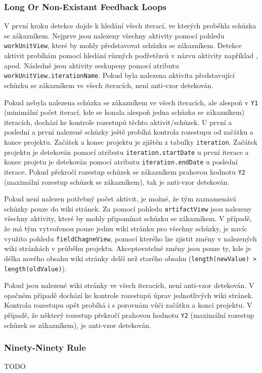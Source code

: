 \documentclass[czech,DP]{thesiskiv}
\begin{document}
\subsubsection{Long Or Non-Existant Feedback Loops}
V první kroku detekce dojde k hledání všech iterací, ve kterých proběhla schůzka se zákazníkem. Nejprve jsou nalezeny všechny aktivity pomocí pohledu \texttt{workUnitView}, které by mohly představovat schůzku se zákazníkem. Detekce aktivit probíhám pomocí hledání různých podřetězců v názvu aktivity například ,  apod. Následně jsou aktivity seskupeny pomocí atributu \texttt{workUnitView.iterationName}. Pokud byla nalezena aktivita představující schůzku se zákazníkem ve všech iteracích, není anti-vzor detekován.
\par
Pokud nebyla nalezena schůzka se zákazníkem ve všech iteracích, ale alespoň v \texttt{Y1} (minimální počet iterací, kde se konala alespoň jedna schůzka se zákazníkem) iteracích, dochází ke kontrole rozestupů těchto aktivit/schůzek. U první a poslední a první nalezené schůzky ještě probíhá kontrola rozestupu od začátku a konce projektu. Začátek a konec projektu je zjištěn z tabulky \texttt{iteration}. Začátek projektu je detekován pomocí atributu \texttt{iteration.startDate} u první iterace a konec projetu je detekován pomocí atributu \texttt{iteration.endDate} u poslední iterace. Pokud překročí rozestup schůzek se zákazníkem prahovou hodnotu \texttt{Y2} (maximální rozestup schůzek se zákazníkem), tak je anti-vzor detekován.
\par
Pokud není nalezen potřebný počet aktivit, je možné, že tým zaznamenává schůzky pouze do wiki stránek. Za pomocí pohledu \texttt{artifactView} jsou nalezeny všechny aktivity, které by mohly připomínat schůzku se zákazníkem. V případě, že má tým vytvořenou pouze jednu wiki stránku pro všechny schůzky, je navíc využito pohledu \texttt{fieldChagneView}, pomocí kterého lze zjistit změny v nalezených wiki stránkách v průběhu projektu. Akceptovatelné změny jsou pouze ty, kde je délka nového obsahu wiki stránky delší než starého obsahu (\texttt{length(newValue) > length(oldValue)}).
\par
Pokud jsou nalezené wiki stránky ve všech iteracích, není anti-vzor detekován. V opačném případě dochází ke kontrole rozestupů úprav jednotlivých wiki stránek. Kontrola rozestupu opět probíhá i s porovnám vůči začátku a konci projektu. V případě, že některý rozestup překročí prahovou hodnotu \texttt{Y2} (maximální rozestup schůzek se zákazníkem), je anti-vzor detekován.
\subsubsection{Ninety-Ninety Rule}
TODO
\end{document}
